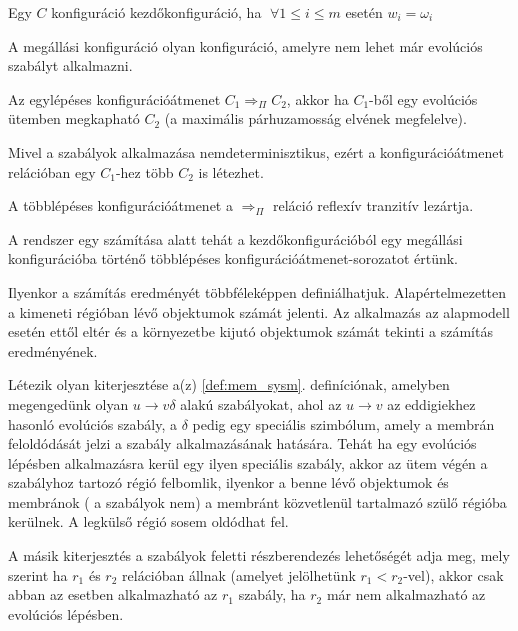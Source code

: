 \begin{note}
Egy $C$ konfiguráció kezdőkonfiguráció, ha $ \; \forall 1 \leq i \leq m$ esetén $w_i = \omega_i$
\end{note}

\begin{definition}
A megállási konfiguráció olyan konfiguráció, amelyre nem lehet már evolúciós szabályt alkalmazni.
\end{definition}

\begin{definition}
Az egylépéses konfigurációátmenet $C_1 \Longrightarrow_\Pi C_2$, akkor ha $C_1$-ből egy evolúciós ütemben megkapható $C_2$ (a maximális párhuzamosság elvének megfelelve). 
\end{definition}

\begin{note}
Mivel a szabályok alkalmazása nemdeterminisztikus, ezért a konfigurációátmenet relációban egy $C_1$-hez több $C_2$ is létezhet.
\end{note}

\begin{definition}
A többlépéses konfigurációátmenet a $\Longrightarrow_\Pi$ reláció reflexív tranzitív lezártja. 
\end{definition}

A rendszer egy számítása alatt tehát a kezdőkonfigurációból egy megállási konfigurációba történő többlépéses konfigurációátmenet-sorozatot értünk.

\begin{note}
Ilyenkor a számítás eredményét többféleképpen definiálhatjuk. Alapértelmezetten a kimeneti régióban lévő objektumok számát jelenti. Az alkalmazás az alapmodell esetén ettől eltér és a környezetbe kijutó objektumok számát tekinti a számítás eredményének.
\end{note}

Létezik olyan kiterjesztése a(z) \ref{def:mem_sysm}. definíciónak, amelyben megengedünk olyan $u \rightarrow v \delta$ alakú szabályokat, ahol az $u \rightarrow v$ az eddigiekhez hasonló evolúciós szabály, a $\delta$ pedig egy speciális szimbólum, amely a membrán feloldódását jelzi a szabály alkalmazásának hatására. Tehát ha egy evolúciós lépésben alkalmazásra kerül egy ilyen speciális szabály, akkor az ütem végén a szabályhoz tartozó régió felbomlik, ilyenkor a benne lévő objektumok és membránok ( a szabályok nem) a membránt közvetlenül tartalmazó szülő régióba kerülnek. A legkülső régió sosem oldódhat fel. 

A másik kiterjesztés a szabályok feletti részberendezés lehetőségét adja meg, mely szerint ha $r_1$ és $r_2$ relációban állnak (amelyet jelölhetünk $r_1 < r_2$-vel), akkor csak abban az esetben alkalmazható az $r_1$ szabály, ha $r_2$ már nem alkalmazható az evolúciós lépésben.

